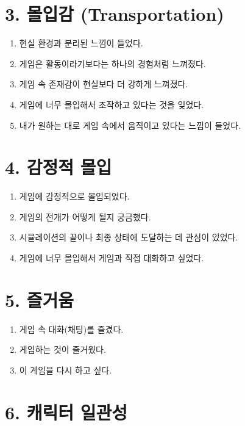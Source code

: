 \documentclass[12pt]{article}
\begin{document}
\section*{3. 몰입감 (Transportation)}

\begin{enumerate}[resume]
  \item 현실 환경과 분리된 느낌이 들었다.
  \item 게임은 활동이라기보다는 하나의 경험처럼 느껴졌다.
  \item 게임 속 존재감이 현실보다 더 강하게 느껴졌다.
  \item 게임에 너무 몰입해서 조작하고 있다는 것을 잊었다.
  \item 내가 원하는 대로 게임 속에서 움직이고 있다는 느낌이 들었다.
\end{enumerate}

\section*{4. 감정적 몰입}

\begin{enumerate}[resume]
  \item 게임에 감정적으로 몰입되었다.
  \item 게임의 전개가 어떻게 될지 궁금했다.
  \item 시뮬레이션의 끝이나 최종 상태에 도달하는 데 관심이 있었다.
  \item 게임에 너무 몰입해서 게임과 직접 대화하고 싶었다.
\end{enumerate}

\section*{5. 즐거움}

\begin{enumerate}[resume]
  \item 게임 속 대화(채팅)를 즐겼다.
  \item 게임하는 것이 즐거웠다.
  \item 이 게임을 다시 하고 싶다.
\end{enumerate}

\section*{6. 캐릭터 일관성}
\end{document}
